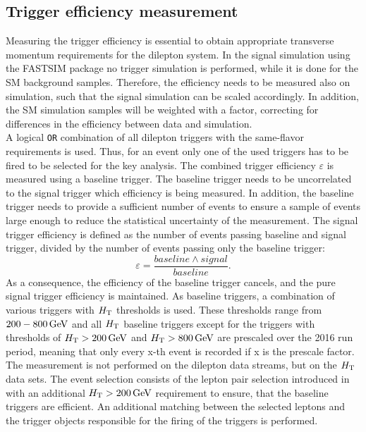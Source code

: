\subsection*{Trigger efficiency measurement}
Measuring the trigger efficiency is essential to obtain appropriate transverse momentum requirements for the dilepton system. In the signal simulation using the \textsc{FASTSIM} package no trigger simulation is performed, while it is done for the SM background samples. Therefore, the efficiency needs to be measured also on simulation, such that the signal simulation can be scaled accordingly. In addition, the SM simulation samples will be weighted with a factor, correcting for differences in the efficiency between data and simulation.\\
A logical \texttt{OR} combination of all dilepton triggers with the same-flavor requirements is used. Thus, for an event only one of the used triggers has to be fired to be selected for the key analysis. The combined trigger efficiency $\varepsilon$ is measured using a baseline trigger. The baseline trigger needs to be uncorrelated to the signal trigger which efficiency is being measured. In addition, the baseline trigger needs to provide a sufficient number of events to ensure a sample of events large enough to reduce the statistical uncertainty of the measurement. The signal trigger efficiency is defined as the number of events passing baseline and signal trigger, divided by the number of events passing only the baseline trigger:
\begin{equation}
 \varepsilon=\frac{baseline \wedge signal}{baseline}.
\end{equation}
As a consequence, the efficiency of the baseline trigger cancels, and the pure signal trigger efficiency is maintained. As baseline triggers, a combination of various triggers with $H_{\mathrm{T}}$ thresholds is used. These thresholds range from $200-800\,\text{Ge\hspace{-.08em}V}$ and all $H_{\mathrm{T}}$ baseline triggers except for the triggers with thresholds of $H_{\mathrm{T}}>200\,\text{Ge\hspace{-.08em}V}$ and $H_{\mathrm{T}}>800\,\text{Ge\hspace{-.08em}V}$ are prescaled over the 2016 run period, meaning that only every x-th event is recorded if x is the prescale factor. The measurement is not performed on the dilepton data streams, but on the $H_{\mathrm{T}}$ data sets. The event selection consists of the lepton pair selection introduced in  with an additional $H_{\mathrm{T}}>200\,\text{Ge\hspace{-.08em}V}$ requirement to ensure, that the baseline triggers are efficient. An additional matching between the selected leptons and the trigger objects responsible for the firing of the triggers is performed.\\

